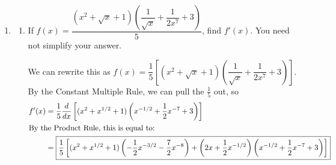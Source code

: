 \documentclass{article}
\theoremstyle{theorem}
\begin{document}
\begin{enumerate}
\begin{enumerate}
  \item
    \begin{problem}[\vfill\newpage]
      Does $f$ have a global maximum on $(-\infty, \infty)$? If so, where? How about a global minimum? 
    \end{problem}

    \begin{solution}
      Since $(-\infty, \infty)$ isn't a closed interval, the Extreme Value Theorem doesn't give us any information about this situation. To decide whether $f$ has a global maximum and minimum on $(-\infty, \infty)$, we need to compare the value of $f$ at the critical points with what happens to $f(x)$ as $x \to \pm \infty$.

      Let's first calculate $\displaystyle \lim_{x \to \infty} x^4 + 4x^3 - 2$. As we've seen, when we're dealing with a sum where some terms go to $\pm \infty$, we can just keep the fastest growing term.\footnote{Why does this work? In the sum $x^4 + 4x^3 - 2$, when $x$ is really big, $x^4$ is much bigger than $4x^3$ and $2$, so $x^4 + 4x^3 - 2 \approx x^4$ when $x$ is very big.} So, $\displaystyle \lim_{x \to \infty} x^4 + 4x^3 - 2 = \lim_{x \to \infty} x^4 = \infty$. Similarly, $\displaystyle \lim_{x \to -\infty} x^4 + 4x^3 - 2 = \lim_{x \to -\infty} x^4 = \infty$.

      In the previous part, we already calculated that $f(-3) = -29$ and $f(0) = -2$. So, we conclude that , and it has a .       
    \end{solution}

  \end{enumerate}      

\item {} 

  \begin{enumerate}
  \item 
    \begin{problem}[\vfill]
      If $\displaystyle f(x) = \dfrac{(x^2 + \sqrt{x} + 1) \left( \dfrac{1}{\sqrt{x}} + \dfrac{1}{2 x^7} + 3 \right)}{5}$, find $f'(x)$. You need not simplify your answer.
    \end{problem}

    \begin{solution}
      We can rewrite this as $f(x) = \dfrac{1}{5} \left[ (x^2 + \sqrt{x} + 1) \left( \dfrac{1}{\sqrt{x}} + \dfrac{1}{2 x^7} + 3 \right) \right]$. By the Constant Multiple Rule, we can pull the $\frac{1}{5}$ out, so 
      \begin{align*}
        f'(x) &= \frac{1}{5} \frac{d}{dx} \left[ (x^2 + x^{1/2} + 1) \left( x^{-1/2} + \frac{1}{2} x^{-7} + 3 \right) \right] \\
        \intertext{By the Product Rule, this is equal to:} %
        &= \boxed{\frac{1}{5} \left[ (x^2 + x^{1/2} + 1) \left( - \frac{1}{2} x^{-3/2} - \frac{7}{2} x^{-8} \right) + \left( 2x + \frac{1}{2} x^{-1/2} \right) \left( x^{-1/2} + \frac{1}{2} x^{-7} + 3 \right) \right]}
      \end{align*}      
    \end{solution}


\end{enumerate}
\end{enumerate}
\end{document}
